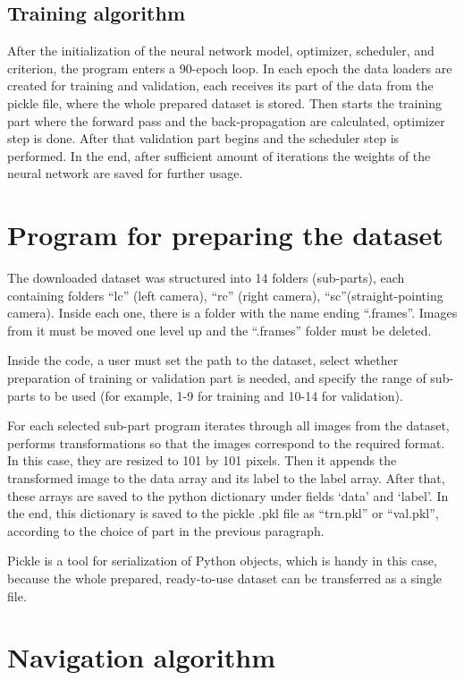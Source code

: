 \subsection{Training algorithm}

After the initialization of the neural network model, optimizer, scheduler, and criterion, the program enters a 90-epoch loop. In each epoch the data loaders are created for training and validation, each receives its part of the data from the pickle file, where the whole prepared dataset is stored. Then starts the training part where the forward pass and the back-propagation are calculated, optimizer step is done. After that validation part begins and the scheduler step is performed. In the end, after sufficient amount of iterations the weights of the neural network are saved for further usage.

\section{Program for preparing the dataset}

The downloaded dataset was structured into 14 folders (sub-parts), each containing folders “lc” (left camera), “rc” (right camera), “sc”(straight-pointing camera). Inside each one, there is a folder with the name ending “.frames”. Images from it must be moved one level up and the “.frames” folder must be deleted. 

Inside the code, a user must set the path to the dataset, select whether preparation of training or validation part is needed, and specify the range of sub-parts to be used (for example, 1-9 for training and 10-14 for validation).

For each selected sub-part program iterates through all images from the dataset, performs transformations so that the images correspond to the required format. In this case, they are resized to 101 by 101 pixels. Then it appends the transformed image to the data array and its label to the label array. After that, these arrays are saved to the python dictionary under fields ‘data’ and ‘label’. In the end, this dictionary is saved to the pickle .pkl file as “trn.pkl” or “val.pkl”, according to the choice of part in the previous paragraph.

Pickle is a tool for serialization of Python objects, which is handy in this case, because the whole prepared, ready-to-use dataset can be transferred as a single file.

\section{Navigation algorithm}

